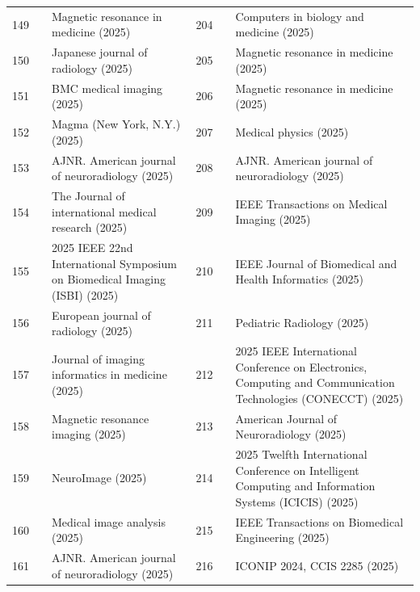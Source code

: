 \documentclass[11pt]{article}
\begin{document}
{\begin{longtable}{r l p{} r l p{}}
149 & \cite{zhu2025a} & Magnetic resonance in medicine (2025) & 204 & \cite{behrendt2025guided} & Computers in biology and medicine (2025) \\
150 & \cite{nishioka2025accelerating} & Japanese journal of radiology (2025) & 205 & \cite{park2025higher} & Magnetic resonance in medicine (2025) \\
151 & \cite{wen2025accelerating} & BMC medical imaging (2025) & 206 & \cite{meng2025motion} & Magnetic resonance in medicine (2025) \\
152 & \cite{marchetto2025agreement} & Magma (New York, N.Y.) (2025) & 207 & \cite{li2025quantitative} & Medical physics (2025) \\
153 & \cite{liu2025application} & AJNR. American journal of neuroradiology (2025) & 208 & \cite{nagaraj2025slice} & AJNR. American journal of neuroradiology (2025) \\
154 & \cite{bjrkeli2025artificial} & The Journal of international medical research (2025) & 209 & \cite{chen2025mri} & IEEE Transactions on Medical Imaging (2025) \\
155 & \cite{angella2025assessing} & 2025 IEEE 22nd International Symposium on Biomedical Imaging (ISBI) (2025) & 210 & \cite{wu2025d} & IEEE Journal of Biomedical and Health Informatics (2025) \\
156 & \cite{nonninger2025assessment} & European journal of radiology (2025) & 211 & \cite{choi2025accelerated} & Pediatric Radiology (2025) \\
157 & \cite{hosseini2025autocornn} & Journal of imaging informatics in medicine (2025) & 212 & \cite{joshi2025arterial} & 2025 IEEE International Conference on Electronics, Computing and Communication Technologies (CONECCT) (2025) \\
158 & \cite{yarach2025blipup} & Magnetic resonance imaging (2025) & 213 & \cite{liu2025deep} & American Journal of Neuroradiology (2025) \\
159 & \cite{you2025conditional} & NeuroImage (2025) & 214 & \cite{mohsen2025deep} & 2025 Twelfth International Conference on Intelligent Computing and Information Systems (ICICIS) (2025) \\
160 & \cite{zhu2025cycleconditional} & Medical image analysis (2025) & 215 & \cite{xu2025deism} & IEEE Transactions on Biomedical Engineering (2025) \\
161 & \cite{kharaji2025dantecaipi} & AJNR. American journal of neuroradiology (2025) & 216 & \cite{wang2025estimating} & ICONIP 2024, CCIS 2285 (2025) \\

\end{longtable}}
\end{document}
